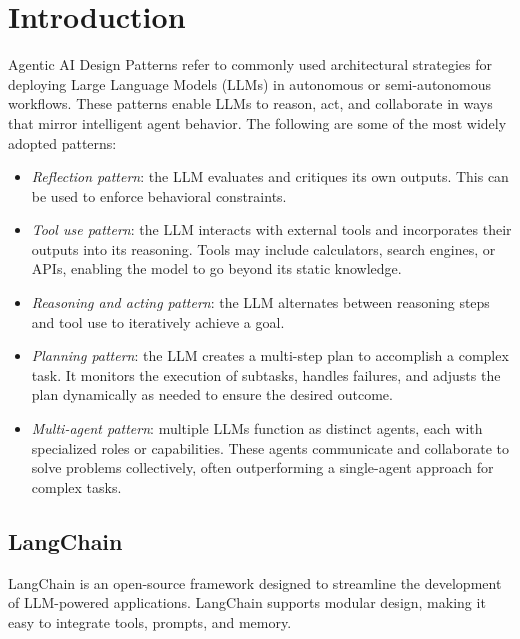 \section{Introduction}

Agentic AI Design Patterns refer to commonly used architectural strategies for deploying Large Language Models (LLMs) in autonomous or semi-autonomous workflows. 
These patterns enable LLMs to reason, act, and collaborate in ways that mirror intelligent agent behavior. 
The following are some of the most widely adopted patterns:
\begin{itemize}
    \item \textit{Reflection pattern}: the LLM evaluates and critiques its own outputs. 
        This can be used to enforce behavioral constraints.
    \item \textit{Tool use pattern}: the LLM interacts with external tools and incorporates their outputs into its reasoning. 
        Tools may include calculators, search engines, or APIs, enabling the model to go beyond its static knowledge.
    \item \textit{Reasoning and acting pattern}: the LLM alternates between reasoning steps and tool use to iteratively achieve a goal. 
    \item \textit{Planning pattern}: the LLM creates a multi-step plan to accomplish a complex task. 
        It monitors the execution of subtasks, handles failures, and adjusts the plan dynamically as needed to ensure the desired outcome.
    \item \textit{Multi-agent pattern}: multiple LLMs function as distinct agents, each with specialized roles or capabilities. 
        These agents communicate and collaborate to solve problems collectively, often outperforming a single-agent approach for complex tasks.
\end{itemize}

\subsection{LangChain}
LangChain is an open-source framework designed to streamline the development of LLM-powered applications. 
LangChain supports modular design, making it easy to integrate tools, prompts, and memory.
